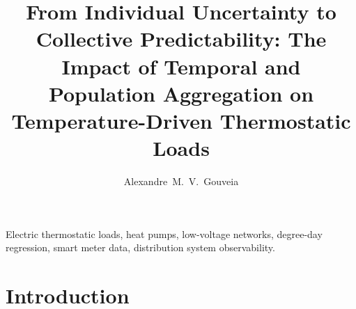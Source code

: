 \documentclass[9pt,journal,a4]{IEEEtran}
\begin{document}
\title{From Individual Uncertainty to Collective Predictability: The Impact of Temporal and Population Aggregation on Temperature-Driven Thermostatic Loads}


\author{Alexandre~M.~V.~Gouveia}

\maketitle

\begin{abstract}
\end{abstract}

\begin{IEEEkeywords}
Electric thermostatic loads, heat pumps, low-voltage networks, degree-day regression, smart meter data, distribution system observability.
\end{IEEEkeywords}


\section{Introduction}
\end{document}
